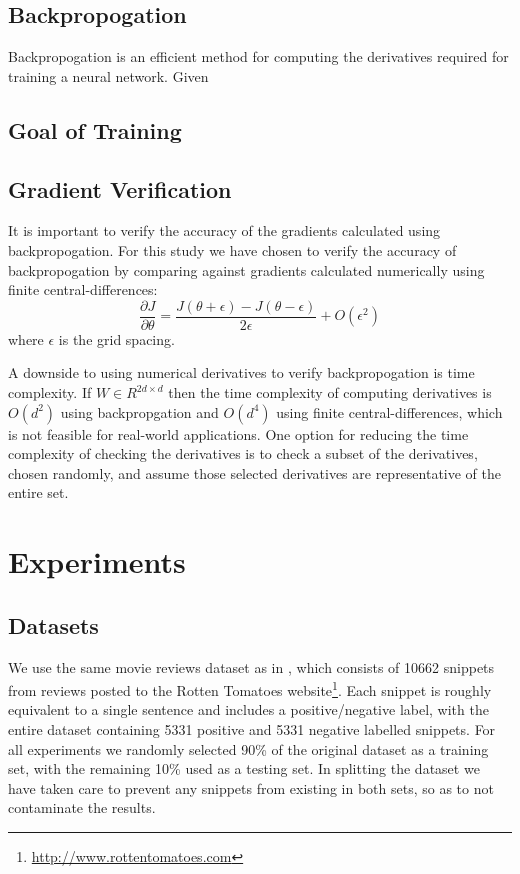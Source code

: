\documentclass{article}
\begin{document}
\subsection{Backpropogation}
Backpropogation is an efficient method for computing the derivatives required for training a neural network. Given



\subsection{Goal of Training}


\subsection{Gradient Verification}
It is important to verify the accuracy of the gradients calculated using backpropogation. For this study we have chosen to verify the accuracy of backpropogation by comparing against gradients calculated numerically using finite central-differences:
\begin{equation}
    \frac{\partial J}{\partial \theta} = \frac{J(\theta + \epsilon) - J(\theta - \epsilon)}{2\epsilon} + O(\epsilon ^2)
\end{equation}
where $\epsilon$ is the grid spacing.

A downside to using numerical derivatives to verify backpropogation is time complexity. If $W \in R^{2d \times d}$ then the time complexity of computing derivatives is $O(d^2)$ using backpropgation and $O(d^4)$ using finite central-differences, which is not feasible for real-world applications. One option for reducing the time complexity of checking the derivatives is to check a subset of the derivatives, chosen randomly, and assume those selected derivatives are representative of the entire set.


\section{Experiments}

%
%
\subsection{Datasets}
We use the same movie reviews dataset as in \cite{Socher}, which consists of 10662 snippets from reviews posted to the Rotten Tomatoes website\footnote{\url{http://www.rottentomatoes.com}}. Each snippet is roughly equivalent to a single sentence and includes a positive/negative label, with the entire dataset containing 5331 positive and 5331 negative labelled snippets. For all experiments we randomly selected 90\% of the original dataset as a training set, with the remaining 10\% used as a testing set. In splitting the dataset we have taken care to prevent any snippets from existing in both sets, so as to not contaminate the results.
\end{document}
